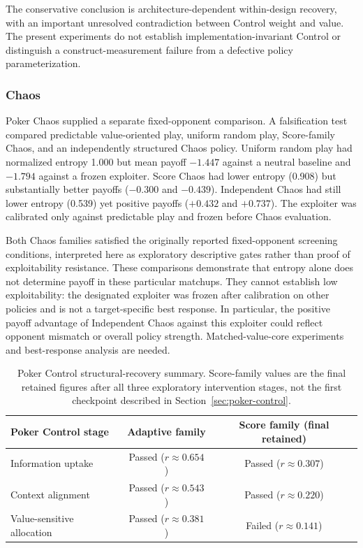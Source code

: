 \documentclass[journal]{IEEEtran}
\begin{document}
The conservative conclusion is architecture-dependent within-design recovery, with an important unresolved contradiction between Control weight and value. The present experiments do not establish implementation-invariant Control or distinguish a construct-measurement failure from a defective policy parameterization.

\subsubsection{Chaos}

Poker Chaos supplied a separate fixed-opponent comparison. A falsification test compared predictable value-oriented play, uniform random play, Score-family Chaos, and an independently structured Chaos policy. Uniform random play had normalized entropy 1.000 but mean payoff $-1.447$ against a neutral baseline and $-1.794$ against a frozen exploiter. Score Chaos had lower entropy (0.908) but substantially better payoffs ($-0.300$ and $-0.439$). Independent Chaos had still lower entropy (0.539) yet positive payoffs ($+0.432$ and $+0.737$). The exploiter was calibrated only against predictable play and frozen before Chaos evaluation.

Both Chaos families satisfied the originally reported fixed-opponent screening conditions, interpreted here as exploratory descriptive gates rather than proof of exploitability resistance. These comparisons demonstrate that entropy alone does not determine payoff in these particular matchups. They cannot establish low exploitability: the designated exploiter was frozen after calibration on other policies and is not a target-specific best response. In particular, the positive payoff advantage of Independent Chaos against this exploiter could reflect opponent mismatch or overall policy strength. Matched-value-core experiments and best-response analysis are needed.

\begin{table}[t]
\caption{Poker Control structural-recovery summary. Score-family values are the final retained figures after all three exploratory intervention stages, not the first checkpoint described in Section~\ref{sec:poker-control}.}
\label{tab:pokercontrol}
\centering
\begin{tabular}{lcc}
\toprule
\textbf{Poker Control stage} & \textbf{Adaptive family} & \textbf{Score family (final retained)} \\
\midrule
Information uptake & Passed ($r \approx 0.654$) & Passed ($r \approx 0.307$) \\
Context alignment & Passed ($r \approx 0.543$) & Passed ($r \approx 0.220$) \\
Value-sensitive allocation & Passed ($r \approx 0.381$) & Failed ($r \approx 0.141$) \\
\bottomrule
\end{tabular}
\end{table}
\end{document}
